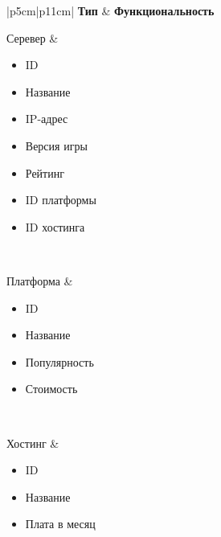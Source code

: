 \captionsetup{justification=raggedleft,singlelinecheck=off}
\begin{table}[H]
    \centering
	\caption{Модели базы данных}
    \label{tbl:db_tables}
	\begin{tabular}{|p{5cm}|p{11cm}|}
        \hline
        \textbf{Тип} & \textbf{Функциональность} \\ \hline
        
        Серевер &
            \begin{minipage}[t]{\linewidth}
                \begin{itemize}[nosep,after=\strut]
                    \item ID
                    \item Название
                    \item IP-адрес
                    \item Версия игры
                    \item Рейтинг
                    \item ID платформы
                    \item ID хостинга
                \end{itemize}
            \end{minipage}
        \\ \hline

        Платформа &
            \begin{minipage}[t]{\linewidth}
                \begin{itemize}[nosep,after=\strut]
                    \item ID
                    \item Название
                    \item Популярность
                    \item Стоимость
                \end{itemize}
            \end{minipage}
        \\ \hline

        Хостинг &
            \begin{minipage}[t]{\linewidth}
                \begin{itemize}[nosep,after=\strut]
                    \item ID
                    \item Название
                    \item Плата в месяц
                \end{itemize}
            \end{minipage}
        \\ \hline


\end{tabular}
\end{table}
